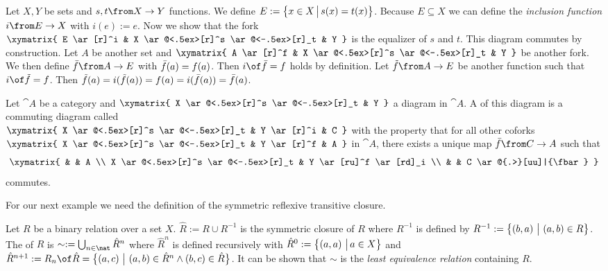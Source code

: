 \begin{example}
  Let $X, Y$ be sets and $s, t \from X \to Y$ functions.
  We define $E := \bigl \{ x \in X \,\big|\, s(x)=t(x) \bigr \}$.
  Because $E \subseteq X$ we can define the \emph{inclusion function} $i \from E \to X$ with $i(e) := e$.
  Now we show that the fork
  $ \xymatrix{
    E \ar[r]^i & X \ar@<.5ex>[r]^s \ar@<-.5ex>[r]_t & Y
  } $
  is the equalizer of $s$ and $t$. This diagram commutes by construction.
  Let $A$ be another set and
  $ \xymatrix{
    A \ar[r]^f & X \ar@<.5ex>[r]^s \ar@<-.5ex>[r]_t & Y
  } $
  be another fork.
  We then define $\fbar \from A \to E$ with $\bar{f}(a) = f(a)$.
  Then $i \of \fbar = f$ holds by definition.
  Let $\ftilde \from A \to E$ be another function such that $i \of \ftilde = f$.
  Then $\tilde{f}(a) = i (\tilde{f}(a)) = f(a) = i (\bar{f}(a)) = \bar{f}(a)$.
\end{example}


\begin{definition}[Coequalizer]
  \label{def:coequa}
  Let $\cat{A}$ be a category and
  $ \xymatrix{
    X \ar@<.5ex>[r]^s \ar@<-.5ex>[r]_t & Y
  } $
  a diagram in $\cat{A}$.
  A  of this diagram is a commuting diagram called  \\
  $ \xymatrix{
    X \ar@<.5ex>[r]^s \ar@<-.5ex>[r]_t & Y \ar[r]^i & C
  } $
  with the property that for all other coforks
  $ \xymatrix{
    X \ar@<.5ex>[r]^s \ar@<-.5ex>[r]_t & Y \ar[r]^f & A
  } $
  in $\cat{A}$, there exists a unique map $\fbar\from C \to A$ such that
  \[ \xymatrix{
    & & A  \\
    X \ar@<.5ex>[r]^s \ar@<-.5ex>[r]_t & Y \ar[ru]^f \ar[rd]_i \\
    & & C \ar@{.>}[uu]|{\fbar}
  } \]
  commutes.
\end{definition}

For our next example we need the definition of the symmetric reflexive transitive closure.

\begin{definition}
  Let $R$ be a binary relation over a set $X$.
  $\hat{R} := R \cup R^{-1}$ is the symmetric closure of $R$ where $R^{-1}$ is defined by
  $R^{-1} := \bigl \{ \left( b , a \right) \,\big|\, \left( a , b \right) \in R \bigr \}$.
  The  of $R$ is $\sim := \bigcup_{n\in\nat} {\hat R}^n$
  where ${\hat R}^n$ is defined recursively with
  ${\hat R}^0 := \bigl \{ \left( a , a \right) \,\big|\, a \in X \bigr \}$ and
  ${\hat R}^{n+1} := R_n \of \hat R = \setMap{\pair{a}{c}}{\pair{a}{b} \in {\hat R}^n \land \pair{b}{c} \in \hat R}$.
  It can be shown that $\sim$ is the \emph{least equivalence relation} containing $R$.
\end{definition}

